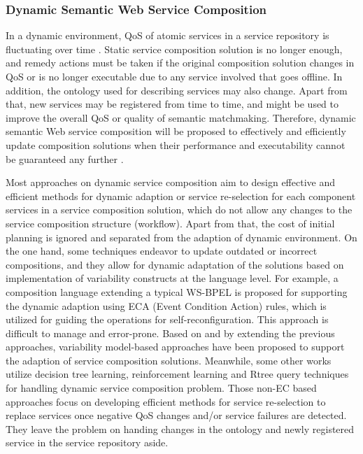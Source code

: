 \subsubsection{Dynamic Semantic Web Service Composition}
In a dynamic environment, QoS of atomic services in a service repository is fluctuating over time \cite{wen2014probabilistic}. Static service composition solution is no longer enough, and remedy actions must be taken if the original composition solution changes in QoS or is no longer executable due to any service involved that goes offline. In addition, the ontology used for describing services may also change. Apart from that, new  services may be registered from time to time, and might be used to improve the overall QoS or quality of semantic matchmaking. Therefore, dynamic semantic Web service composition will be proposed to effectively and efficiently update composition solutions when their performance and executability cannot be guaranteed any further \cite{li2014fault}. 


Most approaches on dynamic service composition aim to design effective and efficient methods for dynamic adaption or service re-selection for each component services in a service composition solution, which do not allow any changes to the service composition structure (workflow). Apart from that, the cost of initial planning is ignored and separated from the adaption of dynamic environment. On the one hand, some techniques \cite{andrews2003business,baresi2011self,koning2009vxbpel} endeavor to update outdated or incorrect compositions, and they allow for dynamic adaptation of the solutions based on implementation of variability constructs at the language level. For example, a composition language extending a typical WS-BPEL \cite{andrews2003business} is proposed for supporting the dynamic adaption using ECA (Event Condition Action) rules, which is utilized for guiding the operations for self-reconfiguration. This approach is difficult to manage and error-prone. Based on and by extending the previous approaches, variability model-based approaches \cite{alferez2014dynamic} have been proposed to support the adaption of service composition solutions. Meanwhile, some other works \cite{mohanty2010web,salas2006ws,wagner2016robust,yin2010qos} utilize decision tree learning, reinforcement learning and Rtree query techniques for handling dynamic service composition problem. Those non-EC based approaches focus on developing efficient methods for service re-selection to replace services once negative QoS changes and/or service failures are detected. They leave the problem on handing changes in the ontology and newly registered service in the service repository aside.

